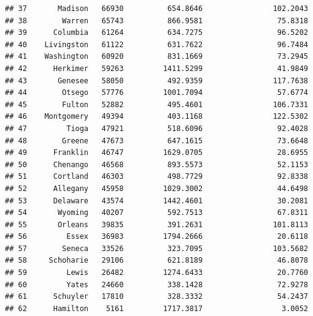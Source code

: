 \documentclass[
  12pt,
]{article}
\begin{document}
\begin{verbatim}
## 37       Madison   66930          654.8646                102.2043
## 38        Warren   65743          866.9581                 75.8318
## 39      Columbia   61264          634.7275                 96.5202
## 40    Livingston   61122          631.7622                 96.7484
## 41    Washington   60920          831.1669                 73.2945
## 42      Herkimer   59263         1411.5299                 41.9849
## 43       Genesee   58050          492.9359                117.7638
## 44        Otsego   57776         1001.7094                 57.6774
## 45        Fulton   52882          495.4601                106.7331
## 46    Montgomery   49394          403.1168                122.5302
## 47         Tioga   47921          518.6096                 92.4028
## 48        Greene   47673          647.1615                 73.6648
## 49      Franklin   46747         1629.0705                 28.6955
## 50      Chenango   46568          893.5573                 52.1153
## 51      Cortland   46303          498.7729                 92.8338
## 52      Allegany   45958         1029.3002                 44.6498
## 53      Delaware   43574         1442.4601                 30.2081
## 54       Wyoming   40207          592.7513                 67.8311
## 55       Orleans   39835          391.2631                101.8113
## 56         Essex   36983         1794.2666                 20.6118
## 57        Seneca   33526          323.7095                103.5682
## 58     Schoharie   29106          621.8189                 46.8078
## 59         Lewis   26482         1274.6433                 20.7760
## 60         Yates   24660          338.1428                 72.9278
## 61      Schuyler   17810          328.3332                 54.2437
## 62      Hamilton    5161         1717.3817                  3.0052
\end{verbatim}
\end{document}
